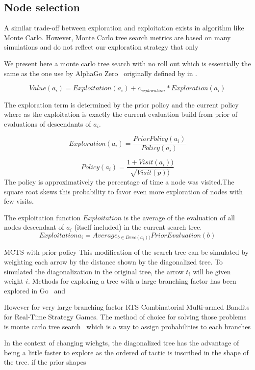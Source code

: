 \documentclass[runningheads,a4paper,draft]{svjour3}
\begin{document}
\subsection{Node selection}

A similar trade-off between exploration and exploitation exists in algorithm 
like Monte Carlo. However, Monte Carlo tree search metrics are based on many 
simulations and do not reflect our exploration strategy that only 


We present here a monte carlo tree search with no roll out which is essentially 
the same as the one use by AlphaGo Zero~\cite{} originally defined by \cite{} 
in \cite{}.

\[Value(a_i) = Exploitation(a_i) + c_{exploration} * Exploration(a_i)\] 

The exploration term is determined by the prior policy and the current policy 
where as the exploitation is exactly the current evaluation build from prior of 
evaluations of descendants of $a_i$.



\[Exploration(a_i) = \frac{PriorPolicy(a_i)}{Policy(a_i)}\]

\[Policy(a_i) = \frac{1 + Visit(a_i))}{\sqrt{Visit(p))}}\]
The policy is approximatively the  percentage of time a node was visited.The 
square root skews this probability to favor even more exploration of nodes with 
few visits. 

The exploitation function $Exploitation$ is the average of the evaluation of 
all nodes descendant of $a_i$ (itself included) in the current search tree.   
\[Exploitation{a_i} = Average_{b \in Desc(a_i))} {PriorEvaluation(b)}\]


MCTS with prior policy
This modification of the search tree can be simulated by weighting each arrow 
by the distance shown by the diagonalized tree. To simulated the 
diagonalization in the original tree, the arrow $t_i$ will be given weight $i$.
Methods for exploring a tree with a large branching factor has been explored  
in Go~\cite{alphago} and 

However for very large branching factor RTS Combinatorial Multi-armed Bandits
for Real-Time Strategy Games. The method of choice for solving those 
problems 
is monte carlo tree search~\cite{mcts} which is a way to assign probabilities 
to each branches

In the context of changing wiehgts, the diagonalized tree has the advantage of 
being a little faster to explore as the ordered of tactic is inscribed in the 
shape of the tree. if the prior shapes 
\end{document}
